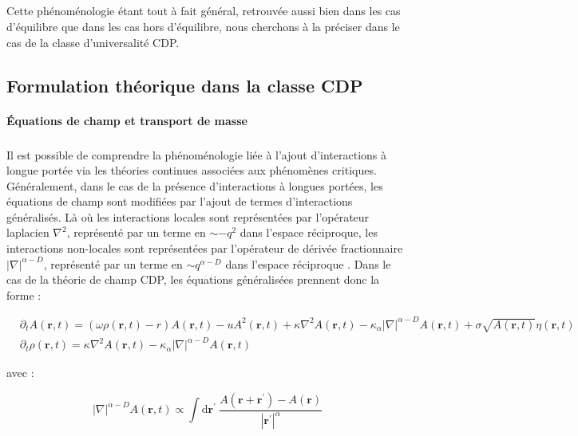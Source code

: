 \subparagraph{}Cette phénoménologie étant tout à fait général, retrouvée aussi bien dans les cas d'équilibre que dans les cas hors d'équilibre, nous cherchons à la préciser dans le cas de la classe d'universalité CDP.

\subsection{Formulation théorique dans la classe CDP}

\paragraph{Équations de champ et transport de masse}

\subparagraph{}Il est possible de comprendre la phénoménologie liée à l'ajout d'interactions à longue portée via les théories continues associées aux phénomènes critiques. Généralement, dans le cas de la présence d'interactions à longues portées, les équations de champ sont modifiées par l'ajout de termes d'interactions généralisés. Là où les interactions locales sont représentées par l'opérateur laplacien $\nabla^2$, représenté par un terme en $\sim -q^2$ dans l'espace réciproque, les interactions non-locales sont représentées par l'opérateur de dérivée fractionnaire $|\nabla|^{\alpha-D}$, représenté par un terme en $\sim q^{\alpha-D}$ dans l'espace réciproque \cite{hinrichsen_non_equilibrium_2007}. Dans le cas de la théorie de champ CDP, les équations généralisées prennent donc la forme :

\begin{equation}
\begin{aligned}
	&\partial_t A(\mathbf{r}, t) = (\omega\rho (\mathbf{r}, t) - r)A(\mathbf{r}, t) - uA^2(\mathbf{r}, t) + \kappa\nabla^2 A (\mathbf{r}, t) - \kappa_\alpha|\nabla|^{\alpha-D} A (\mathbf{r}, t) + \sigma \sqrt{A(\mathbf{r}, t)} \eta(\mathbf{r}, t)\\
	&\partial_t \rho (\mathbf{r}, t) = \kappa\nabla^2 A (\mathbf{r}, t)- \kappa_\alpha|\nabla|^{\alpha-D} A (\mathbf{r}, t)
\end{aligned}
\label{eq:LRCDP}
\end{equation}

\noindent avec :

\begin{equation}
	|\nabla|^{\alpha-D} A (\mathbf{r}, t) \propto \int \mathrm{d}\mathbf{r}^\prime ~ \frac{A(\mathbf{r}+\mathbf{r}^\prime)-A(\mathbf{r})}{|\mathbf{r}^{\prime}|^{\alpha}}
\end{equation}

